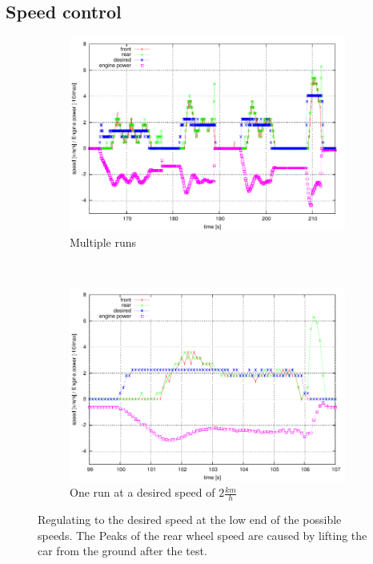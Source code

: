 \documentclass[a4paper
               ,10pt
               ,DIV=10 %
               ,BCOR=0.3cm
               ,pagesize %
               ,headings=small
               ,bibtotoc
               ]
               {scrartcl}
\begin{document}
\subsection{Speed control}
\begin{figure}[H]
  \centering
  \begin{subfigure}[b]{0.5\textwidth}
    \centering
    \includegraphics[width=\textwidth]{pic/plot_slow/plot.pdf}
    \caption{Multiple runs}
		\label{figand1}
  \end{subfigure}~
  \begin{subfigure}[b]{0.5\textwidth}
    \centering
    \includegraphics[width=\textwidth]{pic/plot_slow2/plot.pdf}
    \caption{One run at a desired speed of $2 \frac{km}{h}$}
		\label{figand2}
  \end{subfigure}
  \caption{Regulating to the desired speed at the low end of the possible speeds. The Peaks of the rear wheel speed are caused by lifting the car from the ground after the test.}
\end{figure}
\end{document}
